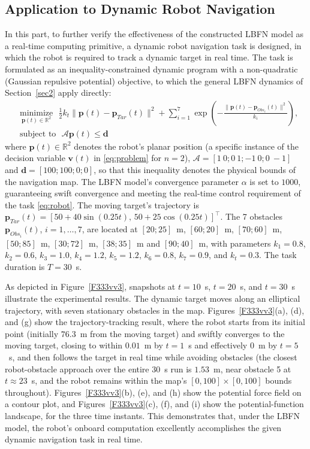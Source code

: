 \documentclass[pdflatex,sn-mathphys,Numbered]{sn-jnl}
\theoremstyle{thmstyleone}
\theoremstyle{thmstyletwo}
\theoremstyle{thmstylethree}
\begin{document}
\subsection{Application to Dynamic Robot Navigation}\label{subsec42}
In this part, to further verify the effectiveness of the constructed LBFN model as a real-time computing primitive, a dynamic robot navigation task is designed, in which the robot is required to track a dynamic target in real time. The task is formulated as an inequality-constrained dynamic program with a non-quadratic (Gaussian repulsive potential) objective, to which the general LBFN dynamics of Section~\ref{sec2} apply directly:
\begin{equation}\label{eq:robot}
\begin{aligned}
& \underset{\bm{p}(t) \in \mathbb{R}^2}{\text{minimize}}~~~ \frac{1}{2}k_t\|\bm{p}(t)-\bm{p}_{Tar}(t)\|^2+\sum_{i=1}^7\exp\left(-\frac{\|\bm{p}(t)-\bm{p}_{Obs_i}(t)\|^2}{k_i}\right),\\
&\text{subject to} ~~~\mathcal{A}\bm{p}(t)\leq\bm{d}
\end{aligned}
\end{equation}
where $\bm{p}(t)\in\mathbb{R}^2$ denotes the robot's planar position (a specific instance of the decision variable $\bm{v}(t)$ in \eqref{eq:problem} for $n=2$), $\mathcal{A}=[1~0;0~1;-1~0;0~-1]$ and $\bm{d}=[100;100;0;0]$, so that this inequality denotes the physical bounds of the navigation map. The LBFN model's convergence parameter $\alpha$ is set to $1000$, guaranteeing swift convergence and meeting the real-time control requirement of the task \eqref{eq:robot}. The moving target's trajectory is $\bm{p}_{Tar}(t)=[50+40\sin(0.25t),\,50+25\cos(0.25t)]^{\top}$. The 7 obstacles $\bm{p}_{Obs_i}(t)$, $i=1,\dots,7$, are located at $[20;25]$~m, $[60;20]$~m, $[70;60]$~m, $[50;85]$~m, $[30;72]$~m, $[38;35]$~m and $[90;40]$~m, with parameters $k_1=0.8$, $k_2=0.6$, $k_3=1.0$, $k_4=1.2$, $k_5=1.2$, $k_6=0.8$, $k_7=0.9$, and $k_t=0.3$. The task duration is $T=30$~s.

As depicted in Figure~\ref{F333vv3}, snapshots at $t=10$~s, $t=20$~s, and $t=30$~s illustrate the experimental results. The dynamic target moves along an elliptical trajectory, with seven stationary obstacles in the map. Figures~\ref{F333vv3}(a), (d), and (g) show the trajectory-tracking result, where the robot starts from its initial point (initially $76.3$~m from the moving target) and swiftly converges to the moving target, closing to within $0.01$~m by $t=1$~s and effectively $0$~m by $t=5$~s, and then follows the target in real time while avoiding obstacles (the closest robot-obstacle approach over the entire $30$~s run is $1.53$~m, near obstacle 5 at $t\approx23$~s, and the robot remains within the map's $[0,100]\times[0,100]$ bounds throughout). Figures~\ref{F333vv3}(b), (e), and (h) show the potential force field on a contour plot, and Figures~\ref{F333vv3}(c), (f), and (i) show the potential-function landscape, for the three time instants. This demonstrates that, under the LBFN model, the robot's onboard computation excellently accomplishes the given dynamic navigation task in real time.
\end{document}
